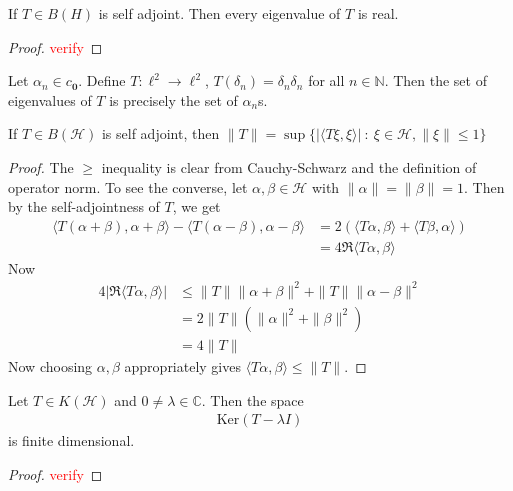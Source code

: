 

\begin{lemma}
  If $T \in B(H)$ is self adjoint. Then every eigenvalue of $T$ is real.
\end{lemma}
\begin{proof}
  \textcolor{red}{verify}
\end{proof}

\begin{example}
  Let $\alpha_n \in c_{\textbf{0}}$. Define $T: \ell^2 \to \ell^2$,
  $T(\delta_n) = \delta_n \delta_n$ for all $ n \in \mathbb{N}$. Then
  the set of eigenvalues of $T$ is precisely the set of $\alpha_n$s.
\end{example}

\begin{lemma}
  \label{lem:spectrum_norm_self_adj}
  If $T \in B(\mathcal{H})$ is self adjoint, then $\|T\| =
  \sup\{|\langle T \xi ,  \xi \rangle| \ : \ \xi \in \mathcal{H},
  \|\xi\| \le 1\}$
\end{lemma}
\begin{proof}
  The $\ge$ inequality is clear from Cauchy-Schwarz and the
  definition of operator norm.
  To see the converse, let $\alpha, \beta \in \mathcal{H}$ with $
  \|\alpha\| = \|\beta\| = 1$. Then by
  the self-adjointness of $T$, we get
  \begin{align*}
    \langle T(\alpha + \beta) , \alpha + \beta \rangle  - \langle
    T(\alpha - \beta) ,   \alpha - \beta \rangle  &= 2 (\langle  T
    \alpha ,  \beta \rangle + \langle T \beta ,  \alpha \rangle  ) \\
    &= 4 \Re \langle T \alpha ,  \beta \rangle
  \end{align*}
  Now
  \begin{align*}
    4 |\Re \langle T \alpha ,  \beta \rangle | & \le \|T\| \|\alpha +
    \beta\|^2 + \|T\| \|\alpha - \beta\|^2 \\
    &=2 \|T\|(\|\alpha\|^2 + \|\beta\|^2) \\
    &=4 \|T\|
  \end{align*}
  Now choosing $\alpha, \beta$ appropriately gives $\langle  T \alpha
  ,  \beta \rangle \le \|T\|$.
\end{proof}

\begin{lemma}
  Let $T \in K(\mathcal{H})$ and $0 \neq \lambda \in \mathbb{C}$.
  Then the space
  \begin{align*}
    \textrm{Ker}(T - \lambda I)
  \end{align*}
  is finite dimensional.
\end{lemma}
\begin{proof}
  \textcolor{red}{verify}
\end{proof}

